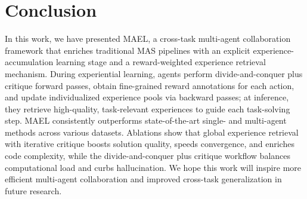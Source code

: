 \documentclass[preprint]{article}
\begin{document}
\section{Conclusion}
\label{sec:conclusion}
In this work, we have presented MAEL, a cross-task multi-agent collaboration framework that enriches traditional MAS pipelines with an explicit experience-accumulation learning stage and a reward-weighted experience retrieval mechanism. During experiential learning, agents perform divide-and-conquer plus critique forward passes, obtain fine-grained reward annotations for each action, and update individualized experience pools via backward passes; at inference, they retrieve high-quality, task-relevant experiences to guide each task-solving step. MAEL consistently outperforms state-of-the-art single- and multi-agent methods across various datasets. Ablations show that global experience retrieval with iterative critique boosts solution quality, speeds convergence, and enriches code complexity, while the divide-and-conquer plus critique workflow balances computational load and curbs hallucination. We hope this work will inspire more efficient multi-agent collaboration and improved cross-task generalization in future research.



\end{document}

